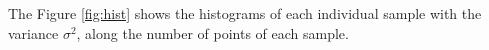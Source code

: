 \documentclass[fleqn,usenatbib, useAMS, a4paper]{mnras}
\begin{document}
The Figure \ref{fig:hist} shows the histograms of each individual sample with the variance  \(\sigma^{2}\), along the number of points of each sample.

\end{document}
